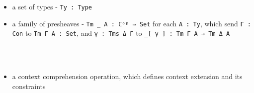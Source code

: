\begin{itemize}
\begin{code}
%
\>[4]%
\>[9]\AgdaSymbol{:}\AgdaSpace{}%
\AgdaSpace{}%
\AgdaSpace{}%
\<%
\\
%
\>[4]%
\>[9]\AgdaSymbol{:}\AgdaSpace{}%
\AgdaSpace{}%
\AgdaSpace{}%
\<%
\end{code}
  \item{a set of types - \texttt{Ty : Type}}
  \item{a family of presheaves - \texttt{Tm \_ A : ℂᵒᵖ ⇒ Set} for each \texttt{A : Ty}, which send \texttt{Γ : Con} to \texttt{Tm Γ A : Set}, and \texttt{γ : Tms Δ Γ} to \texttt{\_[ γ ] : Tm Γ A → Tm Δ A}}
  \begin{code}%
%
\>[4]\AgdaOperator{\AgdaInductiveConstructor{\AgdaUnderscore{}[\AgdaUnderscore{}]}}\AgdaSpace{}%
\AgdaSymbol{:}\AgdaSpace{}%
\AgdaSpace{}%
\AgdaSpace{}%
\AgdaSpace{}%
\AgdaSpace{}%
\AgdaSpace{}%
\AgdaSpace{}%
\AgdaSpace{}%
\AgdaSpace{}%
\AgdaSpace{}%
\AgdaSpace{}%
\<%
\\
%
\>[4]\AgdaInductiveConstructor{[id]}\AgdaSpace{}%
\AgdaSymbol{:}\AgdaSpace{}%
\AgdaSpace{}%
\AgdaOperator{\AgdaInductiveConstructor{[}}\AgdaSpace{}%
\AgdaSpace{}%
\AgdaOperator{\AgdaInductiveConstructor{]}}\AgdaSpace{}%
\AgdaSpace{}%
\<%
\\
%
\>[4]\AgdaInductiveConstructor{[∘]}\AgdaSpace{}%
\AgdaSymbol{:}\AgdaSpace{}%
\AgdaSpace{}%
\AgdaOperator{\AgdaInductiveConstructor{[}}\AgdaSpace{}%
\AgdaSpace{}%
\AgdaSpace{}%
\AgdaSpace{}%
\AgdaOperator{\AgdaInductiveConstructor{]}}\AgdaSpace{}%
\AgdaSpace{}%
\AgdaSpace{}%
\AgdaOperator{\AgdaInductiveConstructor{[}}\AgdaSpace{}%
\AgdaSpace{}%
\AgdaOperator{\AgdaInductiveConstructor{]}}\AgdaSpace{}%
\AgdaOperator{\AgdaInductiveConstructor{[}}\AgdaSpace{}%
\AgdaSpace{}%
\AgdaOperator{\AgdaInductiveConstructor{]}}\<%
\end{code}
  \item{a context comprehension operation, which defines context extension and its constraints}

\end{itemize}

